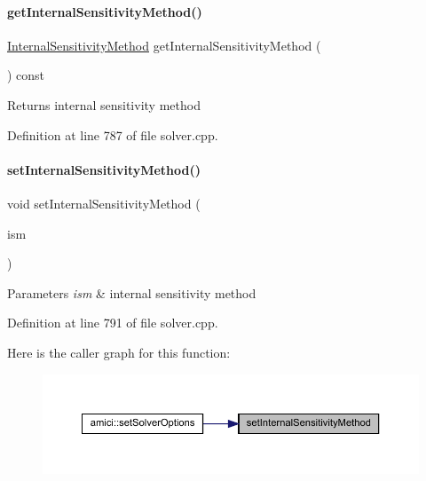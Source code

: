 \paragraph{\texorpdfstring{getInternalSensitivityMethod()}{getInternalSensitivityMethod()}}
{\footnotesize\ttfamily \mbox{\hyperlink{namespaceamici_aa444c52f0a5638d68702d1ec92f8db87}{Internal\+Sensitivity\+Method}} get\+Internal\+Sensitivity\+Method (\begin{DoxyParamCaption}{ }\end{DoxyParamCaption}) const}

\begin{DoxyReturn}{Returns}
internal sensitivity method 
\end{DoxyReturn}


Definition at line 787 of file solver.\+cpp.

\mbox{\label{classamici_1_1_solver_ab114a079f23232a521ad2e81a0a30e36}} 
\paragraph{\texorpdfstring{setInternalSensitivityMethod()}{setInternalSensitivityMethod()}}
{\footnotesize\ttfamily void set\+Internal\+Sensitivity\+Method (\begin{DoxyParamCaption}\item[{\mbox{\hyperlink{namespaceamici_aa444c52f0a5638d68702d1ec92f8db87}{Internal\+Sensitivity\+Method}}}]{ism }\end{DoxyParamCaption})}


\begin{DoxyParams}{Parameters}
{\em ism} & internal sensitivity method \\
\hline
\end{DoxyParams}


Definition at line 791 of file solver.\+cpp.

Here is the caller graph for this function\+:
\nopagebreak
\begin{figure}[H]
\begin{center}
\leavevmode
\includegraphics[width=350pt]{classamici_1_1_solver_ab114a079f23232a521ad2e81a0a30e36_icgraph}
\end{center}
\end{figure}
\mbox{\label{classamici_1_1_solver_a566d267fa2815fe0dd3c29d44f68209b}} 
